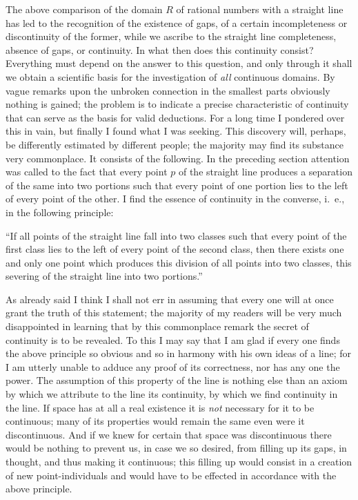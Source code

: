 \documentclass[polutonikogreek,english,twoside,openright]{article}
\begin{document}
The above comparison of the domain $R$ of rational numbers with a
straight line has led to the recognition of the existence of gaps, of
a certain incompleteness or discontinuity of the former, while we
ascribe to the straight line completeness, absence of gaps, or
continuity.  In what then does this continuity consist?  Everything
must depend on the answer to this question, and only through it shall
we obtain a scientific basis for the investigation of \textit{all}
continuous domains.  By vague remarks upon the unbroken connection in
the smallest parts obviously nothing is gained; the problem is to
indicate a precise characteristic of continuity that can serve as the
basis for valid deductions.  For a long time I pondered over this in
vain, but finally I found what I was seeking. This discovery will,
perhaps, be differently estimated by different people; the majority
may find its substance very commonplace.  It consists of the
following. In the preceding section attention was called to the fact
that every point $p$ of the straight line produces a separation of the
same into two portions such that every point of one portion lies to
the left of every point of the other. I find the essence of continuity
in the converse, i.~e., in the following principle:

``If all points of the straight line fall into two classes such that
every point of the first class lies to the left of every point of the
second class, then there exists one and only one point which produces
this division of all points into two classes, this severing of the
straight line into two portions.''

As already said I think I shall not err in assuming that every one
will at once grant the truth of this statement; the majority of my
readers will be very much disappointed in learning that by this
commonplace remark the secret of continuity is to be revealed.  To
this I may say that I am glad if every one finds the above principle
so obvious and so in harmony with his own ideas of a line; for I am
utterly unable to adduce any proof of its correctness, nor has any one
the power. The assumption of this property of the line is nothing else
than an axiom by which we attribute to the line its continuity, by
which we find continuity in the line. If space has at all a real
existence it is \textit{not} necessary for it to be continuous; many
of its properties would remain the same even were it
discontinuous. And if we knew for certain that space was discontinuous
there would be nothing to prevent us, in case we so desired, from
filling up its gaps, in thought, and thus making it continuous; this
filling up would consist in a creation of new point-individuals and
would have to be effected in accordance with the above principle.
\end{document}
